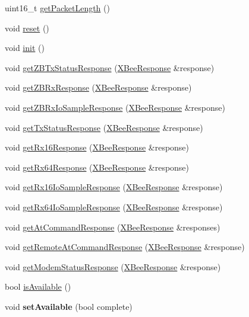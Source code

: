 \begin{DoxyCompactItemize}
\item 
uint16\-\_\-t \hyperlink{classXBeeResponse_a26a7c8baad9cc0322a38db997685d889}{get\-Packet\-Length} ()
\item 
void \hyperlink{classXBeeResponse_aa08a73f576fc7ce2f7fa154342c01fba}{reset} ()
\item 
void \hyperlink{classXBeeResponse_af084604e35462783ecd293ffc090d6dc}{init} ()
\item 
void \hyperlink{classXBeeResponse_a1353f14b87b9cbdc1f8001fb8c5e9d35}{get\-Z\-B\-Tx\-Status\-Response} (\hyperlink{classXBeeResponse}{\-X\-Bee\-Response} \&response)
\item 
void \hyperlink{classXBeeResponse_a4c0edfc6be81349237956531a006d3ab}{get\-Z\-B\-Rx\-Response} (\hyperlink{classXBeeResponse}{\-X\-Bee\-Response} \&response)
\item 
void \hyperlink{classXBeeResponse_a0c1f8d66b1b276fd6d482c589d5cda3d}{get\-Z\-B\-Rx\-Io\-Sample\-Response} (\hyperlink{classXBeeResponse}{\-X\-Bee\-Response} \&response)
\item 
void \hyperlink{classXBeeResponse_a2fd9882d767d48e679a7595b780c2a2d}{get\-Tx\-Status\-Response} (\hyperlink{classXBeeResponse}{\-X\-Bee\-Response} \&response)
\item 
void \hyperlink{classXBeeResponse_ab85f25eac3e57d665e2189d84cb5d2e3}{get\-Rx16\-Response} (\hyperlink{classXBeeResponse}{\-X\-Bee\-Response} \&response)
\item 
void \hyperlink{classXBeeResponse_a72e5b863c14a9ec0a4f1cdeba5f24e58}{get\-Rx64\-Response} (\hyperlink{classXBeeResponse}{\-X\-Bee\-Response} \&response)
\item 
void \hyperlink{classXBeeResponse_ae84d38e3759ebf8b23d256b207e5761d}{get\-Rx16\-Io\-Sample\-Response} (\hyperlink{classXBeeResponse}{\-X\-Bee\-Response} \&response)
\item 
void \hyperlink{classXBeeResponse_ae298de16ed0dce349154ae87f8b93d77}{get\-Rx64\-Io\-Sample\-Response} (\hyperlink{classXBeeResponse}{\-X\-Bee\-Response} \&response)
\item 
void \hyperlink{classXBeeResponse_a5177bb036ccaa6ea30d73541a3e7d414}{get\-At\-Command\-Response} (\hyperlink{classXBeeResponse}{\-X\-Bee\-Response} \&responses)
\item 
void \hyperlink{classXBeeResponse_af359dab94c57006a0fb4b58986744c04}{get\-Remote\-At\-Command\-Response} (\hyperlink{classXBeeResponse}{\-X\-Bee\-Response} \&response)
\item 
void \hyperlink{classXBeeResponse_ad93317521b52825c32b43d34a0f189d1}{get\-Modem\-Status\-Response} (\hyperlink{classXBeeResponse}{\-X\-Bee\-Response} \&response)
\item 
bool \hyperlink{classXBeeResponse_ab60b2cc9e32fa88dee132f410cc8331d}{is\-Available} ()
\item 
\hypertarget{classXBeeResponse_a1814031d09ed316de9f983bd367f3ae4}{void {\bfseries set\-Available} (bool complete)}\label{classXBeeResponse_a1814031d09ed316de9f983bd367f3ae4}


\end{DoxyCompactItemize}
